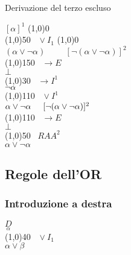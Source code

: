\documentclass{article}
\theoremstyle{break}
\theoremstyle{break}
\theoremstyle{break}
\theoremstyle{break}
\begin{document}
\begin{example}
  Derivazione del terzo escluso

  \begin{center}
    \hspace{0cm}\( [\alpha]^1 \) \hspace{2.8cm} \line(1,0){0} \\
    \hspace{0cm}\line(1,0){50}\(\;\;\; \vee I_1 \) \hspace{2cm} \line(1,0){0}\\
    \( (\alpha \vee \neg \alpha) \hspace{1cm} [\neg(\alpha \vee \neg \alpha)]^2 \) \\
    \hspace{0.9cm}\line(1,0){150}\(\;\;\; \to E \)\\  
    \( \bot \) \\ 
    \hspace{0.9cm}\line(1,0){30}\(\;\;\; \to I^1 \)\\  
    \( \neg \alpha \)\\
    \hspace{0.9cm}\line(1,0){110}\(\;\;\; \vee I^1 \)\\  
    \( \alpha \vee \neg \alpha \hspace{0.5cm} [\neg (\alpha \vee \neg \alpha)]^2 \) \\
    \hspace{0.9cm}\line(1,0){110}\(\;\;\; \to E \)\\  
    \( \bot \) \\
    \hspace{0.9cm}\line(1,0){50}\(\;\;\; RAA^2  \)\\  
    \( \alpha \vee \neg \alpha \) 
  \end{center}
\end{example}


\subsection{Regole dell'OR}
\subsubsection{Introduzione a destra}
\begin{center}
  \( \underset{\alpha}{D} \) \\
  \hspace{0.9cm}\line(1,0){40}\(\;\;\; \vee I_1 \)\\  
  \( \alpha \vee \beta \)
\end{center}
\end{document}
